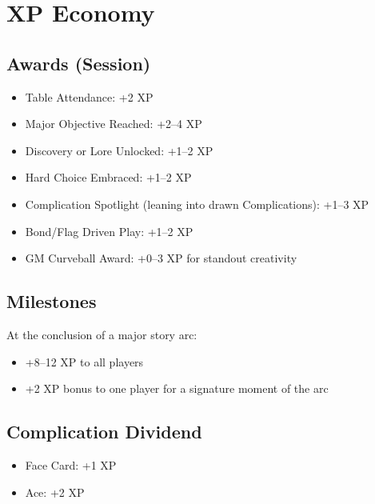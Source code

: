 \section{XP Economy}

\subsection{Awards (Session)}

\begin{itemize}
\item Table Attendance: +2 XP
\item Major Objective Reached: +2--4 XP
\item Discovery or Lore Unlocked: +1--2 XP
\item Hard Choice Embraced: +1--2 XP
\item Complication Spotlight (leaning into drawn Complications): +1--3 XP
\item Bond/Flag Driven Play: +1--2 XP
\item GM Curveball Award: +0--3 XP for standout creativity
\end{itemize}

\subsection{Milestones}

At the conclusion of a major story arc:
\begin{itemize}
\item +8--12 XP to all players
\item +2 XP bonus to one player for a signature moment of the arc
\end{itemize}

\subsection{Complication Dividend}
\begin{itemize}
    \item Face Card: +1 XP
    \item Ace: +2 XP
\end{itemize}

